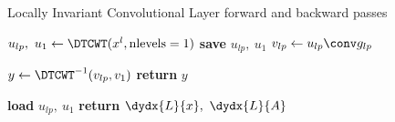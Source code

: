 \begin{algorithm}[tb]
\caption{Locally Invariant Convolutional Layer forward and backward
passes}\label{alg:ch6:inv}
\begin{algorithmic}[1]
\State $u_{lp},\ u_{1} \gets \DTCWT(x^l, \mbox{nlevels}=1) $ 
  \State \textbf{save} $u_{lp},\ u_{1}$ 
  \State $v_{lp} \gets u_{lp} \conv g_{lp}$ 
  \State {}
  \EndFor
  \State $y \gets \DTCWT^{-1}(v_{lp}, v_{1})$
  \State \textbf{return} $y$
\EndProcedure
\end{algorithmic}\vspace{10pt}
\begin{algorithmic}[1]
  \State \textbf{load} $u_{lp},\ u_1$
  \State \textbf{return} $\dydx{L}{x},\ \dydx{L}{A}$
\EndProcedure
\end{algorithmic}
\end{algorithm}

